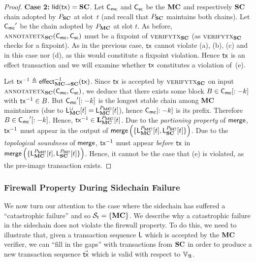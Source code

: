 \begin{proof}
  \textbf{Case 2: } $\llid(\tx) = \Sidechain$.
  Let $\Chainmc$ and $\Chainsc$ be the $\Mainchain$ and respectively $\Sidechain$ chain
  adopted by $\party_\Sidechain$ at slot~$t$ (and recall that $\party_\Sidechain$ maintains
  both chains). Let $\Chainmc'$ be the chain adopted by
  $\party_\Mainchain$ at slot $t$. As before,
  $\textsc{annotatetx}_\Sidechain(\Chainmc,\Chainsc)$ must be a fixpoint of
  $\textsc{verifytx}_\Sidechain$ (as $\textsc{verifytx}_\Sidechain$ checks for a fixpoint).
  As in the previous case, $\tx$ cannot violate (a), (b), (c) and in this case
  nor (d), as this would constitute a fixpoint violation. Hence $\tx$ is an
  effect transaction and we will examine whether $\tx$ constitutes a violation
  of~(e).

  Let $\tx^{-1} \defeq \eff{\Mainchain}{\Sidechain}^{-1}(\tx)$. Since $\tx$ is accepted
  by $\textsc{verifytx}_\Sidechain$ on input
  $\textsc{annotatetx}_\Sidechain(\Chainmc,\Chainsc)$, we deduce that
  there exists some block $B \in \Chainmc[:-k]$
  with $\tx^{-1} \in B$. But $\Chainmc'[:-k]$
  is the longest stable chain among
  $\Mainchain$ maintainers (due to $\LState_\Mainchain^\cup[t] = \LState_\Mainchain^{\party_\Mainchain}[t]$),
  hence $\Chainmc[:-k]$ is its prefix. Therefore
  $B \in \Chainmc'[:-k]$.
  Hence, $\tx^{-1} \in \Ledger^{\party_\Mainchain}_\Mainchain[t]$.
  Due to the \emph{partioning property} of $\merge$, $\tx^{-1}$ must appear in
  the output of $\merge\left(
      \{\LState_\Mainchain^{\party_\Mainchain}[t], \LState_\Sidechain^{\party_\Sidechain}[t]\}
  \right)$.
  Due to the
  \emph{topological soundness} of $\merge$, $\tx^{-1}$ must appear
  \emph{before} $\tx$
  in
  $\merge\left(
      \{\LState_\Mainchain^{\party_\Mainchain}[t], \LState_\Sidechain^{\party_\Sidechain}[t]\}
  \right)$. Hence, it cannot be the case that (e) is violated, as the pre-image
  transaction exists.
\end{proof}

\subsubsection{Firewall Property During Sidechain Failure}


We now turn our attention to the case where the sidechain has suffered a
``catastrophic failure'' and so $\Secure_t = \{\Mainchain\}$. We describe why a
catastrophic failure in the sidechain does not violate the firewall property. To
do this, we need to illustrate that, given a transaction sequence $\LState$ which is
accepted by the $\Mainchain$ verifier, we can ``fill in the gaps'' with transactions
from $\Sidechain$ in order to produce a new transaction sequence $\vec\tx$ which is
valid with respect to $\adalang$.

